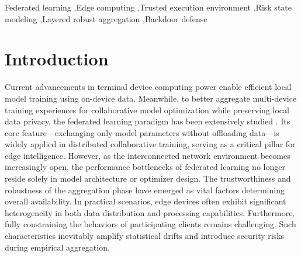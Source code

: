 \documentclass[final,5p,times,twocolumn]{elsarticle/elsarticle}
\begin{document}
\begin{frontmatter}

    \begin{keyword}
        Federated learning \sep Edge computing \sep Trusted execution environment \sep Risk state modeling \sep Layered robust aggregation \sep Backdoor defense
    \end{keyword}

\end{frontmatter}

\section{Introduction}

Current advancements in terminal device computing power enable efficient local model training using on-device data. Meanwhile, to better aggregate multi-device training experiences for collaborative model optimization while preserving local data privacy, the federated learning paradigm has been extensively studied \cite{kairouz2021flsurvey}. Its core feature---exchanging only model parameters without offloading data---is widely applied in distributed collaborative training, serving as a critical pillar for edge intelligence. However, as the interconnected network environment becomes increasingly open, the performance bottlenecks of federated learning no longer reside solely in model architecture or optimizer design. The trustworthiness and robustness of the aggregation phase have emerged as vital factors determining overall availability. In practical scenarios, edge devices often exhibit significant heterogeneity in both data distribution and processing capabilities. Furthermore, fully constraining the behaviors of participating clients remains challenging. Such characteristics inevitably amplify statistical drifts and introduce security risks during empirical aggregation.
\end{document}
